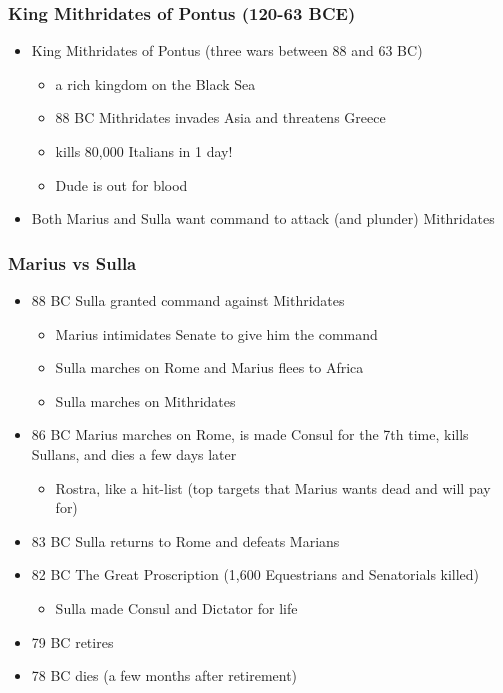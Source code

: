 \documentclass[12pt, twoside]{article}
\begin{document}
\subsubsection{King Mithridates of Pontus (120-63 BCE)}
\begin{itemize}
\item King Mithridates of Pontus (three wars between 88 and 63 BC)
	\begin{itemize}
	\item a rich kingdom on the Black Sea
	\item 88 BC Mithridates invades Asia and threatens Greece
	\item kills 80,000 Italians in 1 day!
	\item Dude is out for blood
	\end{itemize}
\item Both Marius and Sulla want command to attack (and plunder) Mithridates
\end{itemize}	

\subsubsection{Marius vs Sulla}
\begin{itemize}
\item 88 BC Sulla granted command against Mithridates
	\begin{itemize}
	\item Marius intimidates Senate to give him the command
	\item Sulla marches on Rome and Marius flees to Africa
	\item Sulla marches on Mithridates
	\end{itemize}
\item 86 BC Marius marches on Rome, is made Consul for the 7th time, kills Sullans, and dies a few days later
	\begin{itemize}
	\item Rostra, like a hit-list (top targets that Marius wants dead and will pay for)
	\end{itemize}
\item 83 BC Sulla returns to Rome and defeats Marians
\item 82 BC The Great Proscription (1,600 Equestrians and Senatorials killed)
	\begin{itemize}
	\item Sulla made Consul and Dictator for life
	\end{itemize}
\item 79 BC retires
\item 78 BC dies (a few months after retirement)
\end{itemize}
\end{document}
